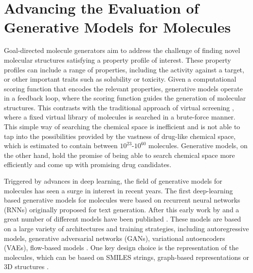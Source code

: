 
\section{Advancing the Evaluation of Generative Models for Molecules\label{sec:generative-models}}
Goal-directed molecule generators aim to address the challenge of finding novel
molecular structures satisfying a property profile of interest. These property
profiles can include a range of properties, including the activity against a
target, or other important traits such as solubility or toxicity. Given a
computational scoring function that encodes the relevant properties, generative
models operate in a feedback loop, where the scoring function guides the
generation of molecular structures. This contrasts with the traditional approach
of virtual screening \citep{todo}, where a fixed virtual library of molecules is
searched in a brute-force manner. This simple way of searching the chemical
space is inefficient and is not able to tap into the possibilities provided by
the vastness of drug-like chemical space, which is estimated to contain between
$10^{23}$-$10^{60}$ molecules. Generative models, on the other hand, hold the
promise of being able to search chemical space more efficiently and come up with
promising drug candidates.

Triggered by advances in deep learning, the field of generative models for
molecules has seen a surge in interest in recent years. The first deep-learning
based generative models for molecules were based on recurrent neural networks
(RNNs) originally proposed for text generation. After this early work by
\citep{seglerGeneratingFocusedMolecule2018} and
\citep{gomez-bombarelliAutomaticChemicalDesign2018} a great number of different
models have been published
\citep{eltonDeepLearningMolecular2019,sanchez-lengelingInverseMolecularDesign2018}.
These models are based on a large variety of architectures and training
strategies, including autoregressive models, generative adversarial networks
(GANs), variational autoencoders (VAEs), flow-based models
\citep{madhawaGraphNVPInvertibleFlow2019}. One key design choice is the
representation of the molecules, which can be based on SMILES strings,
graph-based representations or 3D structures
\citep{eltonDeepLearningMolecular2019,sanchez-lengelingInverseMolecularDesign2018,pangDeepGenerativeModels2024}.

